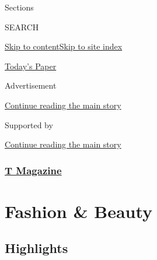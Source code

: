 Sections

SEARCH

\protect\hyperlink{site-content}{Skip to
content}\protect\hyperlink{site-index}{Skip to site index}

\href{https://myaccount.nytimes.com/auth/login?response_type=cookie\&client_id=vi}{}

\href{https://www.nytimes.com/section/todayspaper}{Today's Paper}

Advertisement

\protect\hyperlink{after-top}{Continue reading the main story}

Supported by

\protect\hyperlink{after-sponsor}{Continue reading the main story}

\hypertarget{t-magazine}{%
\subsubsection{\texorpdfstring{\href{/section/t-magazine}{T
Magazine}}{T Magazine}}\label{t-magazine}}

\hypertarget{fashion--beauty}{%
\section{Fashion \& Beauty}\label{fashion--beauty}}

\hypertarget{highlights}{%
\subsection{Highlights}\label{highlights}}

